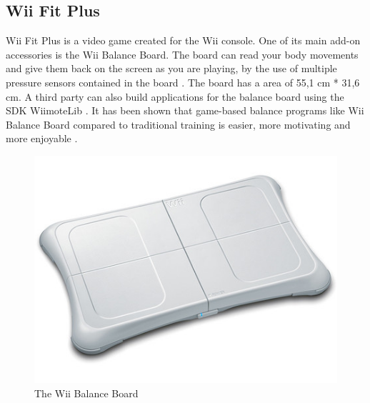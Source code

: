 \subsection{Wii Fit Plus}
Wii Fit Plus is a video game created for the Wii console. One of its main add-on accessories is the Wii Balance Board. The board can read your body movements and give them back on the screen as you are playing, by the use of multiple pressure sensors contained in the board \cite{whatiswiifit}. The board has a area of 55,1 cm {*} 31,6 cm. A third party can also build applications for the balance board using the SDK WiimoteLib \cite{comparison}. It has been shown that game-based balance programs like Wii Balance Board compared to traditional training is easier, more motivating and more enjoyable \cite{taylor2011activity}.
\begin{figure}[h!]
\begin{center}
\includegraphics[scale=0.4]{wiibalance}
\caption[Wii Balance Board]{The Wii Balance Board}
\label{fig:WiiBalanceBoard}
\end{center}
\end{figure}

